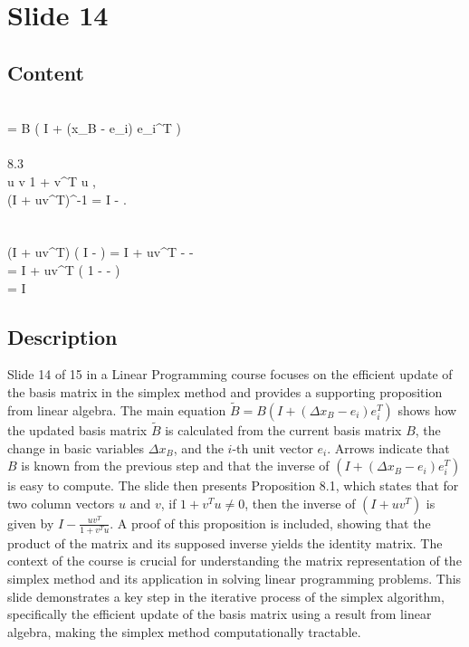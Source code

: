 \documentclass{article}%
\begin{document}
%
\newpage%
\section{Slide 14}%
\label{sec:Slide14}%
\subsection{Content}%

 \\
 = B \left( I + (\Delta x_B - e_i) e_i^T \right) \\
 \\
8.3 \\
 u  v  1 + v^T u , \\
(I + uv^T)^{-1} = I - . \\
 \\
 \\
(I + uv^T) \left( I -  \right) = I + uv^T -  -  \\
= I + uv^T \left( 1 -  -  \right) \\
= I
%
\subsection{Description}%
Slide 14 of 15 in a Linear Programming course focuses on the efficient update of the basis matrix in the simplex method and provides a supporting proposition from linear algebra. The main equation $\tilde{B} = B(I + (\Delta x_B - e_i)e_i^T)$ shows how the updated basis matrix $\tilde{B}$ is calculated from the current basis matrix $B$, the change in basic variables $\Delta x_B$, and the $i$-th unit vector $e_i$.  Arrows indicate that $B$ is known from the previous step and that the inverse of $(I + (\Delta x_B - e_i)e_i^T)$ is easy to compute.  The slide then presents Proposition 8.1, which states that for two column vectors $u$ and $v$, if $1 + v^Tu \ne 0$, then the inverse of $(I + uv^T)$ is given by $I - \frac{uv^T}{1 + v^Tu}$. A proof of this proposition is included, showing that the product of the matrix and its supposed inverse yields the identity matrix.  The context of the course is crucial for understanding the matrix representation of the simplex method and its application in solving linear programming problems. This slide demonstrates a key step in the iterative process of the simplex algorithm, specifically the efficient update of the basis matrix using a result from linear algebra, making the simplex method computationally tractable.%
\end{document}
